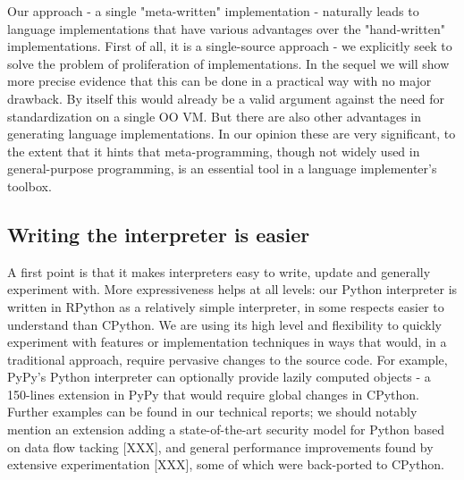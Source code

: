 \documentclass{llncs}
\begin{document}
Our approach - a single "meta-written" implementation - naturally leads
to language implementations that have various advantages over the
"hand-written" implementations.  First of all, it is a single-source
approach - we explicitly seek to solve the problem of proliferation of
implementations.  In the sequel we will show more precise evidence that
this can be done in a practical way with no major drawback.  By itself
this would already be a valid argument against the need for
standardization on a single OO VM.  But there are also other advantages
in generating language implementations. In our opinion these are very
significant, to the extent that it hints that meta-programming, though
not widely used in general-purpose programming, is an essential tool in
a language implementer's toolbox.

\subsection{Writing the interpreter is easier}

A first point is that it makes interpreters easy to write, update and
generally experiment with.  More expressiveness helps at all levels: our
Python interpreter is written in RPython as a relatively simple
interpreter, in some respects easier to understand than CPython.  We are
using its high level and flexibility to quickly experiment with features
or implementation techniques in ways that would, in a traditional
approach, require pervasive changes to the source code.  For example,
PyPy's Python interpreter can optionally provide lazily computed objects
- a 150-lines extension in PyPy that would require global changes in
CPython.  Further examples can be found in our technical reports; we
should notably mention an extension adding a state-of-the-art security
model for Python based on data flow tacking [XXX], and general
performance improvements found by extensive experimentation [XXX], some
of which were back-ported to CPython.
\end{document}

